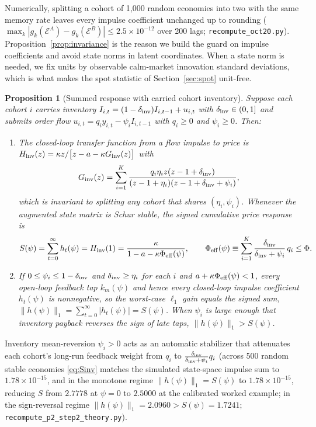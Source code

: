 \documentclass[12pt]{article}
\newtheorem{proposition}[theorem]{Proposition}
\theoremstyle{definition}
\theoremstyle{remark}
\begin{document}
Numerically, splitting a cohort of 1{,}000 random economies into two with the same memory rate leaves every impulse coefficient unchanged up to rounding ($\max_k|g_k(\mathcal E^A)-g_k(\mathcal E^B)|\le2.5\times10^{-12}$ over 200 lags; \texttt{recompute\_oct20.py}). Proposition~\ref{prop:invariance} is the reason we build the guard on impulse coefficients and avoid state norms in latent coordinates. When a state norm is needed, we fix units by observable calm-market innovation standard deviations, which is what makes the spot statistic of Section~\ref{sec:spot} unit-free.

\begin{proposition}[Summed response with carried cohort inventory]\label{prop:inventory_S}
Suppose each cohort $i$ carries inventory $I_{i,t}=(1-\delta_{\rm inv})I_{i,t-1}+u_{i,t}$ with $\delta_{\rm inv}\in(0,1]$ and submits order flow $u_{i,t}=q_i y_{i,t}-\psi_i I_{i,t-1}$ with $q_i\ge0$ and $\psi_i\ge0$. Then:
\begin{enumerate}[label=(\roman*)]
\item The closed-loop transfer function from a flow impulse to price is $H_{\rm inv}(z)=\kappa z/\bigl[z-a-\kappa G_{\rm inv}(z)\bigr]$ with
\[
G_{\rm inv}(z)=\sum_{i=1}^K \frac{q_i\eta_i z(z-1+\delta_{\rm inv})}{(z-1+\eta_i)(z-1+\delta_{\rm inv}+\psi_i)},
\]
which is invariant to splitting any cohort that shares $(\eta_i,\psi_i)$. Whenever the augmented state matrix is Schur stable, the signed cumulative price response is
\begin{equation}\label{eq:Sinv}
S(\psi)=\sum_{t=0}^\infty h_t(\psi)=H_{\rm inv}(1)=\frac{\kappa}{1-a-\kappa\Phi_{\rm eff}(\psi)},\qquad \Phi_{\rm eff}(\psi)\equiv\sum_{i=1}^K\frac{\delta_{\rm inv}}{\delta_{\rm inv}+\psi_i}\,q_i\le\Phi.
\end{equation}
\item If $0\le\psi_i\le 1-\delta_{\rm inv}$ and $\delta_{\rm inv}\ge\eta_i$ for each $i$ and $a+\kappa\Phi_{\rm eff}(\psi)<1$, every open-loop feedback tap $k_m(\psi)$ and hence every closed-loop impulse coefficient $h_t(\psi)$ is nonnegative, so the worst-case $\ell_1$ gain equals the signed sum, $\|h(\psi)\|_1=\sum_{t=0}^\infty |h_t(\psi)|=S(\psi)$. When $\psi_i$ is large enough that inventory payback reverses the sign of late taps, $\|h(\psi)\|_1>S(\psi)$.
\end{enumerate}
\end{proposition}

Inventory mean-reversion $\psi_i>0$ acts as an automatic stabilizer that attenuates each cohort's long-run feedback weight from $q_i$ to $\frac{\delta_{\rm inv}}{\delta_{\rm inv}+\psi_i}q_i$ (across 500 random stable economies \eqref{eq:Sinv} matches the simulated state-space impulse sum to $1.78\times10^{-15}$, and in the monotone regime $\|h(\psi)\|_1=S(\psi)$ to $1.78\times10^{-15}$, reducing $S$ from $2.7778$ at $\psi=0$ to $2.5000$ at the calibrated worked example; in the sign-reversal regime $\|h(\psi)\|_1=2.0960>S(\psi)=1.7241$; \texttt{recompute\_p2\_step2\_theory.py}).
\end{document}

